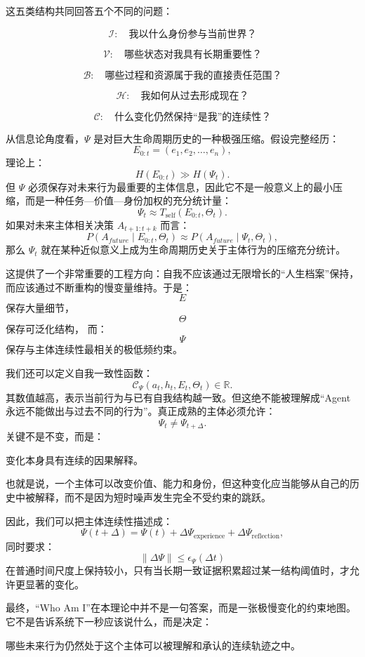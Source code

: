 这五类结构共同回答五个不同的问题：

\[
\mathcal I:
\quad
\text{我以什么身份参与当前世界？}
\]

\[
\mathcal V:
\quad
\text{哪些状态对我具有长期重要性？}
\]

\[
\mathcal B:
\quad
\text{哪些过程和资源属于我的直接责任范围？}
\]

\[
\mathcal H:
\quad
\text{我如何从过去形成现在？}
\]

\[
\mathcal C:
\quad
\text{什么变化仍然保持“是我”的连续性？}
\]

从信息论角度看，$\Psi$ 是对巨大生命周期历史的一种极强压缩。假设完整经历：
\[
E_{0:t}
=
(e_1,e_2,\ldots,e_n),
\]
理论上：
\[
H(E_{0:t})
\gg
H(\Psi_t).
\]
但 $\Psi$ 必须保存对未来行为最重要的主体信息，因此它不是一般意义上的最小压缩，而是一种任务—价值—身份加权的充分统计量：
\[
\boxed{
\Psi_t
\approx
T_{\mathrm{self}}(E_{0:t},\Theta_t).
}
\]
如果对未来主体相关决策 $A_{t+1:t+k}$ 而言：
\[
P(A_{future}\mid E_{0:t},\Theta_t)
\approx
P(A_{future}\mid \Psi_t,\Theta_t),
\]
那么 $\Psi_t$ 就在某种近似意义上成为生命周期历史关于主体行为的压缩充分统计。

这提供了一个非常重要的工程方向：自我不应该通过无限增长的“人生档案”保持，而应该通过不断重构的慢变量维持。于是：
\[
E
\]
保存大量细节，
\[
\Theta
\]
保存可泛化结构，
而：
\[
\Psi
\]
保存与主体连续性最相关的极低频约束。

我们还可以定义自我一致性函数：
\[
\mathcal C_\Psi
\left(
a_t,
h_t,
E_t,
\Theta_t
\right)
\in
\mathbb R.
\]
其数值越高，表示当前行为与已有自我结构越一致。但这绝不能被理解成“Agent 永远不能做出与过去不同的行为”。真正成熟的主体必须允许：
\[
\Psi_t
\neq
\Psi_{t+\Delta}.
\]
关键不是不变，而是：
\begin{statementbox}
变化本身具有连续的因果解释。
\end{statementbox}
也就是说，一个主体可以改变价值、能力和身份，但这种变化应当能够从自己的历史中被解释，而不是因为短时噪声发生完全不受约束的跳跃。

因此，我们可以把主体连续性描述成：
\[
\Psi(t+\Delta)
=
\Psi(t)
+
\Delta\Psi_{\mathrm{experience}}
+
\Delta\Psi_{\mathrm{reflection}},
\]
同时要求：
\[
\|\Delta\Psi\|
\leq
\epsilon_\Psi(\Delta t)
\]
在普通时间尺度上保持较小，只有当长期一致证据积累超过某一结构阈值时，才允许更显著的变化。

最终，“Who Am I”在本理论中并不是一句答案，而是一张极慢变化的约束地图。它不是告诉系统下一秒应该说什么，而是决定：
\begin{statementbox}
哪些未来行为仍然处于这个主体可以被理解和承认的连续轨迹之中。
\end{statementbox}


